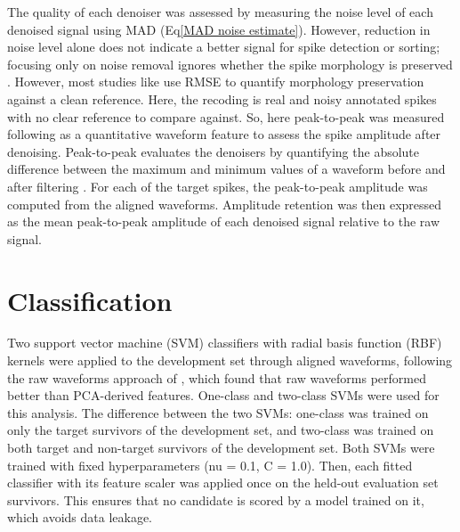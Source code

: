 \documentclass[ %
                    author={Rzan Alkabier},
                    supervisor={Dr. Zahraa Abdallah},
                    degree={MSc},
                     title={Denoising Extracellular Recording for Spike Detection and Classification on Single Channels},
                    subtitle={Does denoising improve detection and classification performance?},
                      type={},
                      year={2026}]{dissertation}
\begin{document}
\noindent
The quality of each denoiser was assessed by measuring the noise level of each denoised signal using MAD (Eq\ref{MAD noise estimate}). However, reduction in noise level alone does not indicate a better signal for spike detection or sorting; focusing only on noise removal ignores whether the spike morphology is preserved \cite{baldazzi_systematic_2020}. However, most studies like \cite{baldazzi_systematic_2020} use RMSE to quantify morphology preservation against a clean reference. Here, the recoding is real and noisy annotated spikes with no clear reference to compare against. So, here peak-to-peak was measured following \cite{adam_comparative_2025, harris_accuracy_2000} as a quantitative waveform feature to assess the spike amplitude after denoising. Peak-to-peak evaluates the denoisers by quantifying the absolute difference between the maximum and minimum values of a waveform before and after filtering \cite{harris_accuracy_2000}. For each of the target spikes, the peak-to-peak amplitude was computed from the aligned waveforms. Amplitude retention was then expressed as the mean peak-to-peak amplitude of each denoised signal relative to the raw signal. 

\section{Classification}
Two support vector machine (SVM) classifiers with radial basis function (RBF) kernels were applied to the development set through aligned waveforms, following the raw waveforms approach of \cite{troglio_hybrid_2026}, which found that raw waveforms performed better than PCA-derived features. One-class and two-class SVMs were used for this analysis. The difference between the two SVMs: one-class was trained on only the target survivors of the development set, and two-class was trained on both target and non-target survivors of the development set. Both SVMs were trained with fixed hyperparameters (nu = 0.1, C = 1.0). Then, each fitted classifier with its feature scaler was applied once on the held-out evaluation set survivors. This ensures that no candidate is scored by a model trained on it, which avoids data leakage. 
\end{document}
